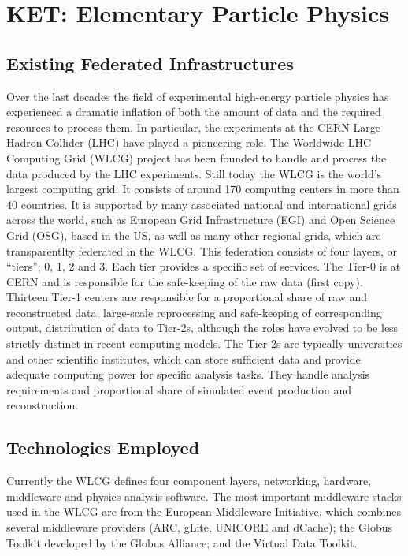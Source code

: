 \section{KET: Elementary Particle Physics}


\subsection{Existing Federated Infrastructures}
Over the last decades the field of experimental high-energy particle
physics has experienced a dramatic inflation of both the amount of
data and the required resources to process them. In particular, the
experiments at the CERN Large Hadron Collider (LHC) have played a
pioneering role. The Worldwide LHC Computing Grid (WLCG) project has
been founded to handle and process the data produced by the LHC
experiments. Still today  the WLCG is the world's largest computing
grid. It consists of around 170 computing centers in more than 40
countries.  It is supported by many associated national and
international grids across the world, such as European Grid
Infrastructure (EGI) and Open Science Grid (OSG), based in the US, as well as many other
regional grids, which are transparentlty federated in the WLCG.  
This federation consists of four layers, or ``tiers''; 0, 1, 2
and 3. Each tier provides a specific set of services. The Tier-0 is at
CERN and is responsible for the safe-keeping of the raw data (first
copy). Thirteen Tier-1 centers are responsible for a proportional
share of raw and reconstructed data, large-scale reprocessing and
safe-keeping of corresponding output, distribution of data to Tier-2s,
although the roles have evolved to be less strictly distinct in recent
computing models.
The Tier-2s are typically universities and other scientific
institutes, which can store sufficient data and provide adequate
computing power for specific analysis tasks. They handle analysis
requirements and proportional share of simulated event production and
reconstruction.


\subsection{Technologies Employed}
Currently the WLCG defines four component layers,  networking, hardware, middleware and
physics analysis software. The most important middleware stacks used
in the WLCG are from the European Middleware Initiative, which
combines several middleware providers (ARC, gLite, UNICORE and
dCache); the Globus Toolkit developed by the Globus Alliance; and the
Virtual Data Toolkit.



